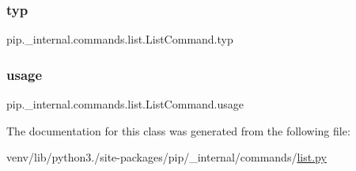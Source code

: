 \subsubsection{\texorpdfstring{typ}{typ}}
{\footnotesize\ttfamily pip.\+\_\+internal.\+commands.\+list.\+List\+Command.\+typ\hspace{0.3cm}{\ttfamily [static]}}

\mbox{\label{classpip_1_1__internal_1_1commands_1_1list_1_1ListCommand_abfe8db95b24cb2ba1a1f68e6c65719cb}} 
\subsubsection{\texorpdfstring{usage}{usage}}
{\footnotesize\ttfamily pip.\+\_\+internal.\+commands.\+list.\+List\+Command.\+usage\hspace{0.3cm}{\ttfamily [static]}}



The documentation for this class was generated from the following file\+:\begin{DoxyCompactItemize}
\item 
venv/lib/python3./site-\/packages/pip/\+\_\+internal/commands/\hyperlink{list_8py}{list.\+py}\end{DoxyCompactItemize}
